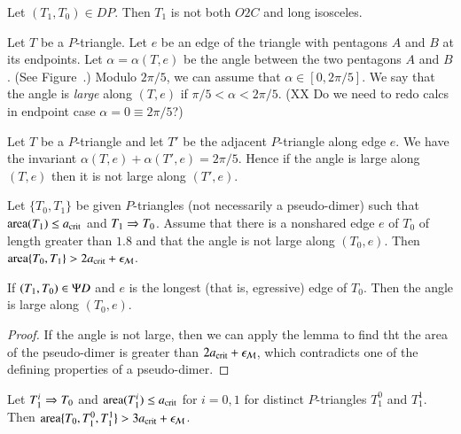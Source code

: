 \begin{lemma}
  Let $(T_1,T_0)\in DP$.  Then $T_1$ is not both $O2C$ and long
  isosceles.
\end{lemma}

\begin{definition}  
  Let $T$ be a $P$-triangle.  Let $e$ be an edge of the triangle with
  pentagons $A$ and $B$ at its endpoints.  Let $\alpha = \alpha(T,e)$
  be the angle between the two pentagons $A$ and $B$.  (See
  Figure~.)  Modulo $2\pi/5$, we can assume that
  $\alpha\in [0,2\pi/5]$.  We say that the angle is {\it large} along
  $(T,e)$ if $\pi/5<\alpha < 2\pi/5$.  (XX Do we need to redo calcs in
  endpoint case $\alpha = 0 \equiv 2\pi/5$?)
\end{definition}


Let $T$ be a $P$-triangle and let $T'$ be the adjacent $P$-triangle
along edge $e$.  We have the invariant
$\alpha(T,e)+\alpha(T',e)=2\pi/5$.  Hence if the angle is large along
$(T,e)$ then it is not large along $(T',e)$.


\begin{lemma}
  Let $\{T_0,T_1\}$ be given $P$-triangles (not necessarily a
  pseudo-dimer) such that ${\operatorname{area}}(T_1)\le a_\text{crit}$ and $T_1\Rightarrow T_0$.
  Assume that there is a nonshared edge $e$ of $T_0$ of length greater
  than $1.8$ and that the angle is not large along $(T_0,e)$.  Then
  ${\operatorname{area}}\{T_0,T_1\} > 2a_\text{crit} + \epsilon_{\mathcal M}$.
\end{lemma}

\begin{corollary}
  If $(T_1,T_0)\in \Psi D$ and $e$ is the longest (that is, egressive)
  edge of $T_0$.  Then the angle is large along $(T_0,e)$.
\end{corollary}

\begin{proof} 
  If the angle is not large, then we can apply the lemma to find tht
  the area of the pseudo-dimer is greater than $2a_\text{crit} + \epsilon_{\mathcal M}$,
  which contradicts one of the defining properties of a pseudo-dimer.
\end{proof}

\begin{lemma}
  Let $T_1^i\Rightarrow T_0$ and ${\operatorname{area}}(T_1^i)\le a_\text{crit}$ for $i=0,1$ for
  distinct $P$-triangles $T_1^0$ and $T_1^1$.  Then
  ${\operatorname{area}}\{T_0,T_1^0,T_1^1\} > 3a_\text{crit} + \epsilon_{\mathcal M}$.
\end{lemma}

